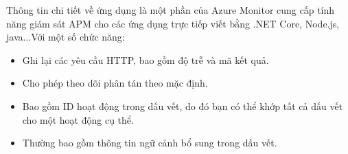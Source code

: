 \begin{itemize}
        \newline
        Thông tin chi tiết về ứng dụng là một phần của Azure Monitor cung cấp tính năng giám sát APM cho các ứng dụng trực tiếp viết bằng .NET Core, Node.js, java...Với một số chức năng:
            \begin{itemize}
                \item Ghi lại các yêu cầu HTTP, bao gồm độ trễ và mã kết quả.
                \item Cho phép theo dõi phân tán theo mặc định.
                \item Bao gồm ID hoạt động trong dấu vết, do đó bạn có thể khớp tất cả dấu vết cho một hoạt động cụ thể.
                \item Thường bao gồm thông tin ngữ cảnh bổ sung trong dấu vết. 
            \end{itemize}
    \end{itemize}
